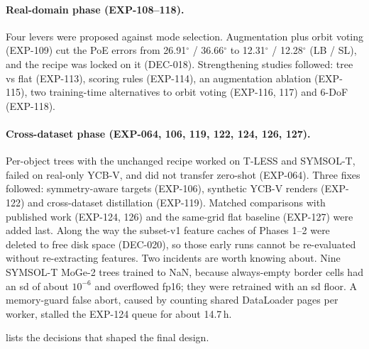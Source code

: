 \paragraph{Real-domain phase (EXP-108--118).}
Four levers were proposed against mode selection. Augmentation plus orbit voting (EXP-109) cut the PoE errors from 26.91$^\circ$ / 36.66$^\circ$ to 12.31$^\circ$ / 12.28$^\circ$ (LB / SL), and the recipe was locked on it (DEC-018). Strengthening studies followed: tree vs flat (EXP-113), scoring rules (EXP-114), an augmentation ablation (EXP-115), two training-time alternatives to orbit voting (EXP-116, 117) and 6-DoF (EXP-118).

\paragraph{Cross-dataset phase (EXP-064, 106, 119, 122, 124, 126, 127).}
Per-object trees with the unchanged recipe worked on T-LESS and SYMSOL-T, failed on real-only YCB-V, and did not transfer zero-shot (EXP-064). Three fixes followed: symmetry-aware targets (EXP-106), synthetic YCB-V renders (EXP-122) and cross-dataset distillation (EXP-119). Matched comparisons with published work (EXP-124, 126) and the same-grid flat baseline (EXP-127) were added last. Along the way the subset-v1 feature caches of Phases 1--2 were deleted to free disk space (DEC-020), so those early runs cannot be re-evaluated without re-extracting features. Two incidents are worth knowing about. Nine SYMSOL-T MoGe-2 trees trained to NaN, because always-empty border cells had an sd of about $10^{-6}$ and overflowed fp16; they were retrained with an sd floor. A memory-guard false abort, caused by counting shared DataLoader pages per worker, stalled the EXP-124 queue for about 14.7\,h.

 lists the decisions that shaped the final design.

